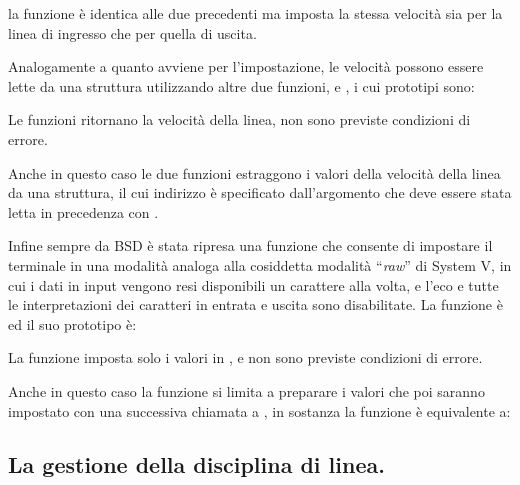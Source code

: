 \noindent la funzione è identica alle due precedenti ma imposta la stessa
velocità sia per la linea di ingresso che per quella di uscita.

Analogamente a quanto avviene per l'impostazione, le velocità possono essere
lette da una struttura  utilizzando altre due funzioni,
 e , i cui prototipi sono:

\begin{funcproto}{
}

{Le funzioni ritornano la velocità della linea, non sono previste condizioni
  di errore.}
\end{funcproto}

Anche in questo caso le due funzioni estraggono i valori della velocità della
linea da una struttura, il cui indirizzo è specificato dall'argomento
 che deve essere stata letta in precedenza con
.

Infine sempre da BSD è stata ripresa una funzione che consente di impostare il
terminale in una modalità analoga alla cosiddetta modalità ``\textit{raw}'' di
System V, in cui i dati in input vengono resi disponibili un carattere alla
volta, e l'eco e tutte le interpretazioni dei caratteri in entrata e uscita
sono disabilitate. La funzione è  ed il suo prototipo è:

\begin{funcproto}{
}

{La funzione imposta solo i valori in , e non
    sono previste condizioni di errore.}
\end{funcproto}

Anche in questo caso la funzione si limita a preparare i valori che poi
saranno impostato con una successiva chiamata a , in sostanza
la funzione è equivalente a:


\subsection{La gestione della disciplina di linea.}
\label{sec:term_line_discipline}

